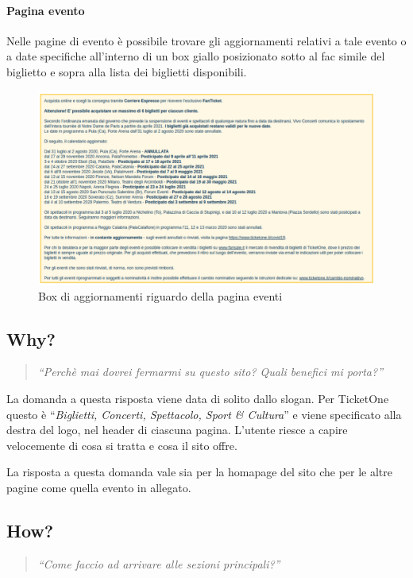 	\paragraph{Pagina evento}
		Nelle pagine di evento è possibile trovare gli aggiornamenti relativi a tale evento o a date specifiche all'interno di un box giallo posizionato sotto al fac simile del biglietto e sopra alla lista dei biglietti disponibili.
		\begin{figure}[hbt]
			\centering
			\includegraphics[width=\textwidth]{img/when.png}
			\caption{Box di aggiornamenti riguardo della pagina eventi}
			\label{when}
		\end{figure}
		
\subsection{Why?}
	\begin{quote}
		\emph{``Perchè mai dovrei fermarmi su questo sito? Quali benefici mi porta?''}
	\end{quote}
	La domanda a questa risposta viene data di solito dallo slogan.
	Per TicketOne questo è ``\textit{Biglietti, Concerti, Spettacolo, Sport \& Cultura}'' e viene specificato alla destra del logo, nel header di ciascuna pagina.
	L'utente riesce a capire velocemente di cosa si tratta e cosa il sito offre.
	\par La risposta a questa domanda vale sia per la homapage del sito che per le altre pagine come quella evento in allegato.
		
\subsection{How?}
	\begin{quote}
		\emph{``Come faccio ad arrivare alle sezioni principali?''}
	\end{quote}
